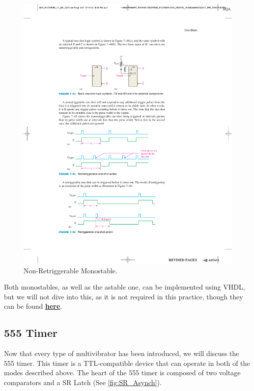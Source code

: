\documentclass[a4paper, 11pt, oneside]{article}
\begin{document}
\begin{figure}[H]
    \centering
    \includegraphics[scale = 1]{Graphics/Practice 2/GRAPHICS/MONOSTABLE/NON-RETRIGGERABLE.pdf}
    \caption{Non-Retriggerable Monostable. ~\autocite{FLOYD}}
    \label{fig:NON-RETRIGGERABLE}
\end{figure}


Both monostables, as well as the astable one, can be implemented using VHDL, but we will not dive into this, as it is not required in this practice, though they can be found \href{https://drive.google.com/open?id=1J-T80ZyF3isizOMjBf8xZOD7rw0KesP-}{\textbf{here}}.

\clearpage

\subsection{555 Timer}

Now that every type of multivibrator has been introduced, we will discuss the 555 timer. This timer is a TTL-compatible device that can operate in both of the modes described above. The heart of the 555 timer is composed of two voltage comparators and a SR Latch (See \ref{fig:SR_Asynch}). \medskip
\end{document}
